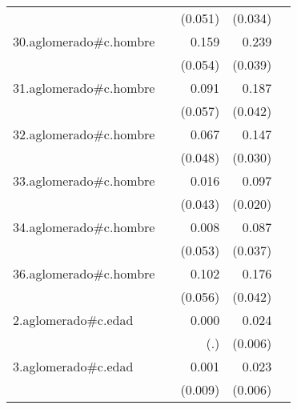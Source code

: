 {\begin{longtable}{l*{4}{D{.}{.}{-1}}}
            &                     &     (0.051)         &     (0.034)         &                     \\
\addlinespace
30.aglomerado#c.hombre&                     &       0.159\sym{**} &       0.239\sym{***}&                     \\
            &                     &     (0.054)         &     (0.039)         &                     \\
\addlinespace
31.aglomerado#c.hombre&                     &       0.091         &       0.187\sym{***}&                     \\
            &                     &     (0.057)         &     (0.042)         &                     \\
\addlinespace
32.aglomerado#c.hombre&                     &       0.067         &       0.147\sym{***}&                     \\
            &                     &     (0.048)         &     (0.030)         &                     \\
\addlinespace
33.aglomerado#c.hombre&                     &       0.016         &       0.097\sym{***}&                     \\
            &                     &     (0.043)         &     (0.020)         &                     \\
\addlinespace
34.aglomerado#c.hombre&                     &       0.008         &       0.087\sym{*}  &                     \\
            &                     &     (0.053)         &     (0.037)         &                     \\
\addlinespace
36.aglomerado#c.hombre&                     &       0.102         &       0.176\sym{***}&                     \\
            &                     &     (0.056)         &     (0.042)         &                     \\
\addlinespace
2.aglomerado#c.edad&                     &       0.000         &       0.024\sym{***}&                     \\
            &                     &         (.)         &     (0.006)         &                     \\
\addlinespace
3.aglomerado#c.edad&                     &       0.001         &       0.023\sym{***}&                     \\
            &                     &     (0.009)         &     (0.006)         &                     \\

\end{longtable}}
